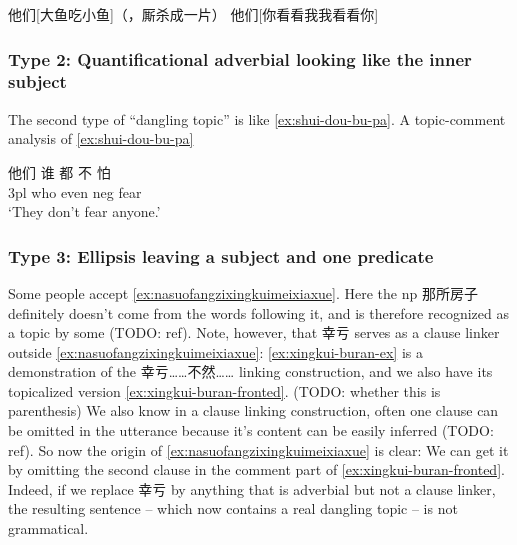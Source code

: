 \documentclass[UTF8, a4paper, oneside, scheme=plain]{ctexrep}
\newcommand{\translate}[1]{`#1'}
\begin{document}
\begin{exe}
    \ex\label{ex:dayuchixiaoyu} 他们[大鱼吃小鱼]（，厮杀成一片）
    \ex\label{ex:nikankanwo} 他们[你看看我我看看你]
\end{exe}

\subsubsection{Type 2: Quantificational adverbial looking like the inner subject}

The second type of ``dangling topic'' is like \eqref{ex:shui-dou-bu-pa}.
A topic-comment analysis of \eqref{ex:shui-dou-bu-pa} 

\begin{exe}
    \ex\label{ex:shui-dou-bu-pa} \gll 他们 谁 都 不 怕 \\
    3pl who even \acs{neg} fear \\
    \glt \translate{They don't fear anyone.}
\end{exe}

\subsubsection{Type 3: Ellipsis leaving a subject and one predicate}

Some people accept \eqref{ex:nasuofangzixingkuimeixiaxue}.
Here the \acs{np} 那所房子 definitely doesn't come from the words following it,
and is therefore recognized as a topic by some (TODO: ref). 
Note, however, that 幸亏 serves as a clause linker outside \eqref{ex:nasuofangzixingkuimeixiaxue}:
\eqref{ex:xingkui-buran-ex} is a demonstration of the 幸亏……不然…… linking construction,
and we also have its topicalized version \eqref{ex:xingkui-buran-fronted}. (TODO: whether this is parenthesis)
We also know in a clause linking construction,
often one clause can be omitted in the utterance because it's content can be easily inferred (TODO: ref).
So now the origin of \eqref{ex:nasuofangzixingkuimeixiaxue} is clear:
We can get it by omitting the second clause in the comment part of \eqref{ex:xingkui-buran-fronted}.
Indeed, if we replace 幸亏 by anything that is adverbial but not a clause linker,
the resulting sentence -- which now contains a real dangling topic -- is not grammatical.
\end{document}
